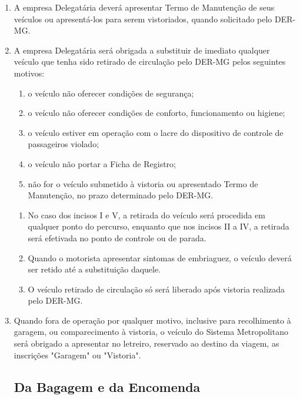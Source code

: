 \begin{enumerate}[resume, label=Art. \arabic*]
\item A empresa Delegatária deverá apresentar Termo de Manutenção de seus veículos ou apresentá-los para serem vistoriados, quando solicitado pelo DER-MG.

\item  A empresa Delegatária será obrigada a substituir de imediato qualquer veículo que tenha sido retirado de circulação pelo DER-MG pelos seguintes motivos:

\begin{enumerate}[label=\roman*.]

\item o veículo não oferecer condições de segurança;

\item o veículo não oferecer condições de conforto, funcionamento ou higiene;

\item o veículo estiver em operação com o lacre do dispositivo de controle de passageiros violado;

\item o veículo não portar a Ficha de Registro;

\item não for o veículo submetido à vistoria ou apresentado Termo de Manutenção, no prazo determinado pelo DER-MG.

\end{enumerate}

\begin{enumerate}[label= \S \arabic*] %

\item No caso dos incisos I e V, a retirada do veículo será procedida em qualquer ponto do percurso, enquanto que nos incisos II a IV, a retirada será efetivada no ponto de controle ou de parada.

\item Quando o motorista apresentar sintomas de embriaguez, o veículo deverá ser retido até a substituição daquele.

\item O veículo retirado de circulação só será liberado após vistoria realizada pelo DER-MG.

\end{enumerate}

\item Quando fora de operação por qualquer motivo, inclusive para recolhimento à garagem, ou comparecimento à vistoria, o veículo do Sistema Metropolitano será obrigado a apresentar no letreiro, reservado ao destino da viagem, as inscrições "Garagem" ou "Vistoria".

\subsection{Da Bagagem e da Encomenda}

\end{enumerate}

